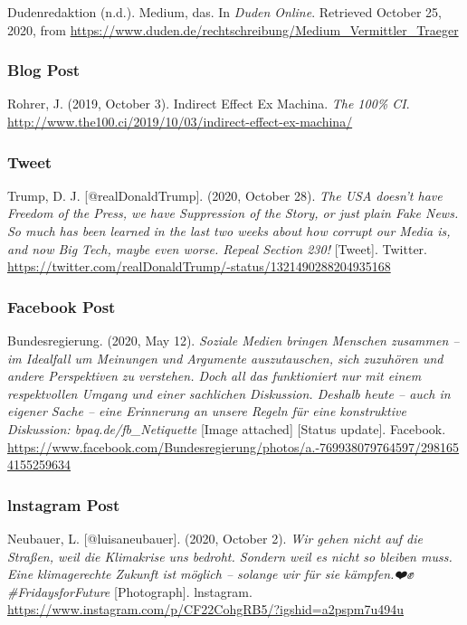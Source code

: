 \documentclass[
  letterpaper,
  DIV=11]{scrreprt}
\begin{document}
Dudenredaktion (n.d.). Medium, das. In \emph{Duden Online}. Retrieved
October 25, 2020, from
\url{https://www.duden.de/rechtschreibung/Medium_Vermittler_Traeger}

\subsubsection{Blog Post}\label{blog-post}

Rohrer, J. (2019, October 3). Indirect Effect Ex Machina. \emph{The
100\% CI}.
\url{http://www.the100.ci/2019/10/03/indirect-effect-ex-machina/}

\subsubsection{Tweet}\label{tweet}

Trump, D. J. {[}@realDonaldTrump{]}. (2020, October 28). \emph{The USA
doesn't have Freedom of the Press, we have Suppression of the Story, or
just plain Fake News. So much has been learned in the last two weeks
about how corrupt our Media is, and now Big Tech, maybe even worse.
Repeal Section 230!} {[}Tweet{]}. Twitter.
\url{https://twitter.com/realDonaldTrump/-status/1321490288204935168}

\subsubsection{Facebook Post}\label{facebook-post}

Bundesregierung. (2020, May 12). \emph{Soziale Medien bringen Menschen
zusammen -- im Idealfall um Meinungen und Argumente auszutauschen, sich
zuzuhören und andere Perspektiven zu verstehen. Doch all das
funktioniert nur mit einem respektvollen Umgang und einer sachlichen
Diskussion. Deshalb heute -- auch in eigener Sache -- eine Erinnerung an
unsere Regeln für eine konstruktive Diskussion: bpaq.de/fb\_Netiquette}
{[}Image attached{]} {[}Status update{]}. Facebook.
\url{https://www.facebook.com/Bundesregierung/photos/a.-769938079764597/2981654155259634}

\subsubsection{lnstagram Post}\label{lnstagram-post}

Neubauer, L. {[}@luisaneubauer{]}. (2020, October 2). \emph{Wir gehen
nicht auf die Straßen, weil die Klimakrise uns bedroht. Sondern weil es
nicht so bleiben muss. Eine klimagerechte Zukunft ist möglich -- solange
wir für sie kämpfen.❤️✊ \#FridaysforFuture} {[}Photograph{]}.
lnstagram.
\url{https://www.instagram.com/p/CF22CohgRB5/?igshid=a2pspm7u494u}
\end{document}

